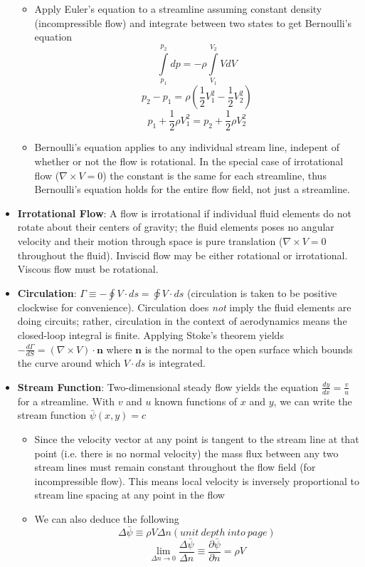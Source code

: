 \documentclass[11pt]{article}
\newcommand{\Item}[1]{\item \textbf{#1}:}
\newcommand{\CenteredBoxed}[1]{\begin{center}\boxed{#1}\end{center}}
\newcommand{\intlim}[2]{\int\limits_{#1}^{#2}}
\begin{document}
\begin{itemize}
\begin{itemize}
	\item Apply Euler's equation to a streamline assuming constant density (incompressible flow) and integrate between two states to get Bernoulli's equation 
	$$\intlim{p_1}{p_2}dp = -\rho\intlim{V_1}{V_2}VdV$$
	$$p_2-p_1 = \rho\left(\frac{1}{2}V_1^2 - \frac{1}{2}V_2^2\right)$$
	$$p_1 + \frac{1}{2}\rho V_1^2 = p_2 + \frac{1}{2}\rho V_2^2$$
	\CenteredBoxed{p+\frac{1}{2}\rho V^2 = const.}
	\item Bernoulli's equation applies to any individual stream line, indepent of whether or not the flow is rotational. In the special case of irrotational flow ($\nabla\times V = 0$) the constant is the same for each streamline, thus Bernoulli's equation holds for the entire flow field, not just a streamline.
	\end{itemize}
\Item{Irrotational Flow} A flow is irrotational if individual fluid elements do not rotate about their centers of gravity; the fluid elements poses no angular velocity and their motion through space is pure translation ($\nabla\times V = 0$ throughout the fluid). Inviscid flow may be either rotational or irrotational. Viscous flow must be rotational.
\Item{Circulation} $\Gamma\equiv-\oint V\cdot ds=\varointclockwise V\cdot ds$ (circulation is taken to be positive clockwise for convenience). Circulation does \emph{not} imply the fluid elements are doing circuits; rather, circulation in the context of aerodynamics means the closed-loop integral is finite. Applying Stoke's theorem yields $-\frac{d\Gamma}{dS} = (\nabla\times V)\cdot\mathbf{n}$ where $\mathbf{n}$ is the normal to the open surface which bounds the curve around which $V\cdot ds$ is integrated.
\Item{Stream Function} Two-dimensional steady flow yields the equation $\frac{dy}{dx} = \frac{v}{u}$ for a streamline. With $v$ and $u$ known functions of $x$ and $y$, we can write the stream function $\bar{\psi}(x,y) = c$
	\begin{itemize}
	\item Since the velocity vector at any point is tangent to the stream line at that point (i.e. there is no normal velocity) the mass flux between any two stream lines must remain constant throughout the flow field (for incompressible flow). This means local velocity is inversely proportional to stream line spacing at any point in the flow
	\item We can also deduce the following
	$$ \Delta\bar{\psi}\equiv\rho V\Delta n(unit\ depth\ into\ page)$$
	$$\lim_{\Delta n\to0}\frac{\Delta\bar{\psi}}{\Delta n}\equiv\frac{\partial\bar{\psi}}{\partial n} = \rho V$$

\end{itemize}
\end{itemize}
\end{document}
